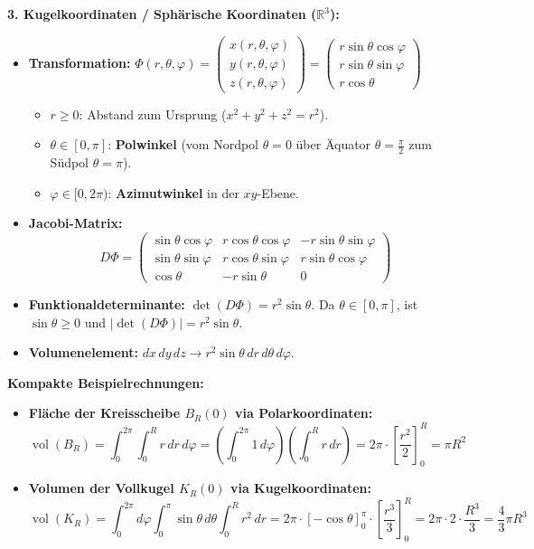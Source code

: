 \begin{definition}
    \textbf{3. Kugelkoordinaten / Sphärische Koordinaten ($\mathbb{R}^3$):}
    \begin{itemize}
        \item \textbf{Transformation:} $\Phi(r, \theta, \varphi) = \begin{pmatrix} x(r, \theta, \varphi) \\ y(r, \theta, \varphi) \\ z(r, \theta, \varphi) \end{pmatrix} = \begin{pmatrix} r \sin\theta \cos\varphi \\ r \sin\theta \sin\varphi \\ r \cos\theta \end{pmatrix}$
        \begin{itemize}
            \item $r \ge 0$: Abstand zum Ursprung ($x^2 + y^2 + z^2 = r^2$).
            \item $\theta \in [0, \pi]$: \textbf{Polwinkel} (vom Nordpol $\theta = 0$ über Äquator $\theta = \frac{\pi}{2}$ zum Südpol $\theta = \pi$).
            \item $\varphi \in [0, 2\pi)$: \textbf{Azimutwinkel} in der $xy$-Ebene.
        \end{itemize}
        \item \textbf{Jacobi-Matrix:}
        $$ D\Phi = \begin{pmatrix}
            \sin\theta \cos\varphi & r \cos\theta \cos\varphi & -r \sin\theta \sin\varphi \\
            \sin\theta \sin\varphi & r \cos\theta \sin\varphi & r \sin\theta \cos\varphi \\
            \cos\theta & -r \sin\theta & 0
        \end{pmatrix} $$
        \item \textbf{Funktionaldeterminante:} $\det(D\Phi) = r^2 \sin\theta$. Da $\theta \in [0, \pi]$, ist $\sin\theta \ge 0$ und $|\det(D\Phi)| = r^2 \sin\theta$.
        \item \textbf{Volumenelement:} $dx \, dy \, dz \longrightarrow r^2 \sin\theta \, dr \, d\theta \, d\varphi$.
    \end{itemize}
\end{definition}

\begin{example}
    \textbf{Kompakte Beispielrechnungen:}
    \begin{itemize}
        \item \textbf{Fläche der Kreisscheibe $B_R(0)$ via Polarkoordinaten:}
        $$ \operatorname{vol}(B_R) = \int_0^{2\pi} \int_0^R r \, dr \, d\varphi = \left( \int_0^{2\pi} 1 \, d\varphi \right) \left( \int_0^R r \, dr \right) = 2\pi \cdot \left[ \frac{r^2}{2} \right]_0^R = \pi R^2 $$
        \item \textbf{Volumen der Vollkugel $K_R(0)$ via Kugelkoordinaten:}
        $$ \operatorname{vol}(K_R) = \int_0^{2\pi} d\varphi \int_0^\pi \sin\theta \, d\theta \int_0^R r^2 \, dr = 2\pi \cdot [-\cos\theta]_0^\pi \cdot \left[ \frac{r^3}{3} \right]_0^R = 2\pi \cdot 2 \cdot \frac{R^3}{3} = \frac{4}{3} \pi R^3 $$
    \end{itemize}
\end{example}
